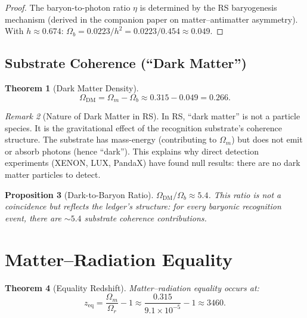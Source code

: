 \documentclass[12pt,a4paper]{article}
\newtheorem{theorem}{Theorem}[section]
\newtheorem{proposition}[theorem]{Proposition}
\theoremstyle{definition}
\theoremstyle{remark}
\newtheorem{remark}[theorem]{Remark}
\begin{document}
\begin{proof}
The baryon-to-photon ratio $\eta$ is determined by the RS
baryogenesis mechanism (derived in the companion paper on
matter--antimatter asymmetry).  With $h \approx 0.674$:
$\Omega_b = 0.0223/h^2 = 0.0223/0.454 \approx 0.049$.
\end{proof}

\subsection{Substrate Coherence (``Dark Matter'')}

\begin{theorem}[Dark Matter Density]
\label{thm:dm}
\begin{equation}
  \Omega_{\mathrm{DM}} = \Omega_m - \Omega_b
  \approx 0.315 - 0.049 = 0.266.
\end{equation}
\end{theorem}

\begin{remark}[Nature of Dark Matter in RS]
In RS, ``dark matter'' is not a particle species.  It is the
gravitational effect of the recognition substrate's coherence
structure.  The substrate has mass-energy (contributing to
$\Omega_m$) but does not emit or absorb photons (hence ``dark'').
This explains why direct detection experiments (XENON, LUX, PandaX)
have found null results: there are no dark matter particles to
detect.
\end{remark}

\begin{proposition}[Dark-to-Baryon Ratio]
$\Omega_{\mathrm{DM}}/\Omega_b \approx 5.4$.  This ratio is not
a coincidence but reflects the ledger's structure: for every
baryonic recognition event, there are $\sim 5.4$ substrate
coherence contributions.
\end{proposition}

\section{Matter--Radiation Equality}
\label{sec:equality}

\begin{theorem}[Equality Redshift]
\label{thm:equality}
Matter--radiation equality occurs at:
\begin{equation}
  z_{\mathrm{eq}} = \frac{\Omega_m}{\Omega_r} - 1
  \approx \frac{0.315}{9.1 \times 10^{-5}} - 1
  \approx 3460.
\end{equation}
\end{theorem}
\end{document}
